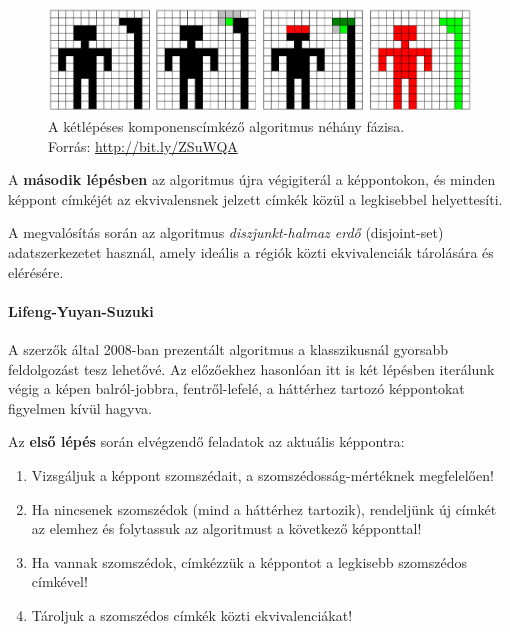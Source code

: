 \begin{figure}[!ht]
\centering
\includegraphics[width=140mm, keepaspectratio]{figures/labeling.png}
\caption{A kétlépéses komponenscímkéző algoritmus néhány fázisa. \\ Forrás: \url{http://bit.ly/ZSuWQA}}
\label{fig:labeling}
\end{figure}

A \textbf{második lépésben} az algoritmus újra végigiterál a képpontokon, és minden képpont címkéjét az ekvivalensnek jelzett címkék közül a legkisebbel helyettesíti.

A megvalósítás során az algoritmus \emph{diszjunkt-halmaz erdő} (disjoint-set) adatszerkezetet használ, amely ideális a régiók közti ekvivalenciák tárolására és elérésére. 


\paragraph{Lifeng-Yuyan-Suzuki}

A szerzők által 2008-ban prezentált algoritmus \cite{suzuki} a klasszikusnál gyorsabb feldolgozást tesz lehetővé. Az előzőekhez hasonlóan itt is két lépésben iterálunk végig a képen balról-jobbra, fentről-lefelé, a háttérhez tartozó képpontokat figyelmen kívül hagyva.

\bigskip

Az \textbf{első lépés} során elvégzendő feladatok az aktuális képpontra:

\begin{enumerate}
  \item Vizsgáljuk a képpont szomszédait, a szomszédosság-mértéknek megfelelően!
  \item Ha nincsenek szomszédok (mind a háttérhez tartozik), rendeljünk új címkét az elemhez és folytassuk az algoritmust a következő képponttal!
  \item Ha vannak szomszédok, címkézzük a képpontot a legkisebb szomszédos címkével!
  \item Tároljuk a szomszédos címkék közti ekvivalenciákat!
\end{enumerate}

